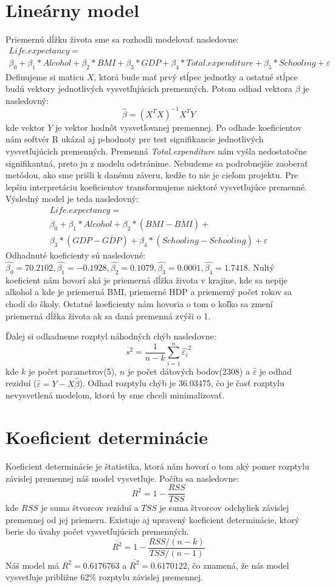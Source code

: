 \section*{Lineárny model}
Priemernú dĺžku života sme sa rozhodli modelovať nasledovne:
\[
    \begin{array}{c}
    Life.expectancy =\\
     \beta_0 + \beta_1*Alcohol + \beta_2*BMI + \beta_3*GDP + \beta_4*Total.expenditure + \beta_5*Schooling + \varepsilon
    \end{array}
\]  
Definujeme si maticu $X$, ktorá bude mať prvý stĺpec jednotky a ostatné stĺpce budú vektory jednotlivých
vysvetľujúcich premenných. Potom odhad vektora $\beta$ je nasledovný:
\[
    \hat{\beta} = (X^TX)^{-1}X^TY  
\]
kde vektor $Y$ je vektor hodnôt vysvetľovanej premennej. Po odhade koeficientov nám softvér R ukázal aj p-hodnoty pre test signifikancie jednotlivých vysvetľujúcich premenných.
Premenná \textit{Total.expenditure} nám vyšla nedostatočne signifikantná, preto ju z modelu odstránime. Nebudeme sa podrobnejšie zaoberať metódou, ako sme prišli k danému záveru, kedže to nie je cieľom projektu.
Pre lepšiu interpretáciu koeficientov transformujeme niektoré vysvetľujúce premenné. Výsledný model je teda nasledovný:
\[
    \begin{array}{c}
    Life.expectancy = \\
    \beta_0 + \beta_1*Alcohol + \beta_2*(BMI-\overline{BMI}) + \\
    \beta_3*(GDP-\overline{GDP}) + \beta_4*(Schooling-\overline{Schooling}) + \varepsilon
    \end{array}
\]
Odhadnuté koeficienty sú nasledovné: $\hat{\beta_0}=70.2102, \hat{\beta_1}= -0.1928, \hat{\beta_2}=0.1079,  \hat{\beta_3}=0.0001, \hat{\beta_4}=1.7418$. Nultý koeficient nám hovorí
aká je priemerná dĺžka života v krajine, kde sa nepije alkohol a kde je priemerná BMI, priemerné HDP a priemerný počet rokov sa chodí do školy. Ostatné koeficienty nám hovoria o tom o koľko sa zmení priemerná dĺžka života ak sa daná premenná zvýši o 1.

Ďalej si odhadneme rozptyl náhodných chýb nasledovne:
\[
    s^2  = \frac{1}{n-k}\sum_{i=1}^{n}{\hat{\varepsilon_i}^2}
\]
kde $k$ je počet parametrov(5), $n$ je počet dátových bodov(2308) a $\hat{\varepsilon}$ je odhad reziduí ($\hat{\varepsilon} = Y - X\hat{\beta}$). 
Odhad rozptylu chýb je 36.03475, čo je časť rozptylu nevysvetlená modelom, ktorú by sme chceli minimalizovať.

\section*{Koeficient determinácie}
Koeficient determinácie je štatistika, ktorá nám hovorí o tom aký pomer rozptylu závislej premennej náš model vysvetľuje.
Počíta sa nasledovne:
\[
    R^2 = 1 - \frac{RSS}{TSS}  
\]
kde $RSS$ je suma štvorcov reziduí a $TSS$ je suma štvorcov odchyliek závislej premennej od jej priemeru.
Existuje aj upravený koeficient determinácie, ktorý berie do úvahy počet vysvetľujúcich premenných.
\[
  \overline{R^2} = 1 - \frac{RSS/(n-k)}{TSS/(n-1)}  
\]
Náš model má $R^2 = 0.6176763$ a $\overline{R^2} = 0.6170122$, čo znamená, že nás model vysvetľuje približne 62\% rozptylu závislej premennej.

